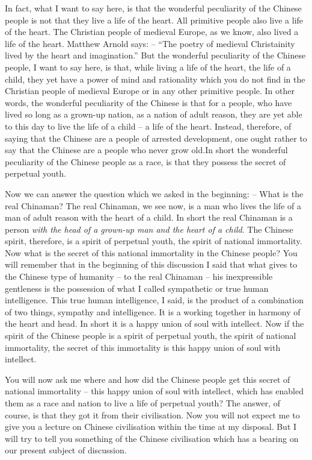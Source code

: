 In fact, what I want to say here, is that the wonderful peculiarity of the Chinese people is not that they live a life of the heart.
All primitive people also live a life of the heart. The Christian people of medieval Europe, as we know, also lived a life of the heart. Matthew Arnold says: -- ``The poetry of medieval Christainity lived by the heart and imagination.''
But the wonderful peculiarity of the Chinese people, I want to say here, is that, while living a life of the heart, the life of a child, they yet have a power of mind and rationality
which you do not find in the Christian people of medieval Europe or in any other primitive people. In other words, the wonderful peculiarity of the Chinese is that for a people, who have lived so long as a grown-up nation, as a nation of adult reason, they are yet able to this day to live the life of a child
-- a life of the heart.
Instead, therefore, of saying that the Chinese are a people of arrested development, one ought rather to say that the Chinese are a people who never grow old.In short the wonderful peculiarity of the Chinese people as a race, is that they possess the secret of perpetual youth.

Now we can answer the question which we asked in the beginning: -- What is the real Chinaman? The real Chinaman, we see now, is a man who lives the life of a man of adult reason with the heart of a child. In short the real Chinaman is a person \emph{with the head of a grown-up man and the heart of a child}. The Chinese spirit, therefore, is a spirit of perpetual youth, the spirit of national immortality. Now what is the secret of this national immortality in the Chinese people? You will remember that in the beginning of this discussion I said that what gives to the Chinese type of humanity -- to the real Chinaman -- his inexpressible gentleness is the possession of what I called sympathetic or true human intelligence. This true human intelligence, I said, is the product of a combination of two things, sympathy and intelligence. It is a working together in harmony of the heart and head. In short it is a happy union of soul with intellect. Now if the spirit of the Chinese people is a spirit of perpetual youth, the spirit of national immortality, the secret of this immortality is this happy union of soul with intellect.

You will now ask me where and how did the Chinese people get this secret of national immortality -- this happy union of soul with intellect, which has enabled them as a race and nation to live a life of perpetual youth? The answer, of course, is that they got it from their civilisation. Now you will not expect me to give you a lecture on Chinese civilisation within the time at my disposal. But I will try to tell you something of the Chinese civilisation which has a bearing on our present subject of discussion.

